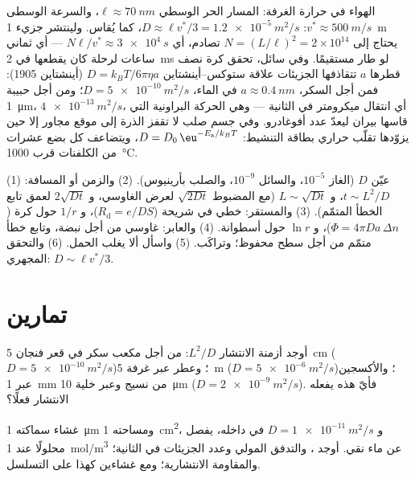 \begin{example}\label{ex:b2:particle-diffusion:kinetic}
الهواء في حرارة الغرفة: المسار الحر الوسطي $\ell \approx \qty{70}{nm}$،
والسرعة الوسطى $v^* \approx \qty{500}{m/s}$: $D \approx \ell v^*/3 =
\qty{1.2e-5}{m^2/s}$، كما يُقاس. ولينتشر جزيء \qty{1}{m}
يحتاج إلى $N = (L/\ell)^2 = 2 \times 10^{14}$ تصادم، أي $N\ell/v^*
\approx \qty{3e4}{s}$ --- أي ثماني ساعات لرحلة كان يقطعها في
\qty{2}{ms} لو طار مستقيمًا. وفي سائل، تحقق كرة نصف قطرها $a$
تتقاذفها الجزيئات علاقة ستوكس--أينشتاين $D =
k_BT/6\pi\eta a$ (أينشتاين 1905): فمن أجل السكر، $a \approx \qty{0.4}{nm}$
في الماء، $D = \qty{5e-10}{m^2/s}$؛ ومن أجل حبيبة \qty{1}{\micro m}،
$\qty{4e-13}{m^2/s}$، أي انتقال ميكرومتر في الثانية ---
وهي الحركة البراونية التي قاسها بيران ليعدّ عدد أفوغادرو. وفي
جسم صلب لا تقفز الذرة إلى موقع مجاور إلا حين يزوّدها تقلّب
حراري بطاقة التنشيط: $D = D_0\,\eu^{-E_{\text{a}}/k_BT}$،
ويتضاعف كل بضع عشرات من الكلفنات قرب \qty{1000}{\celsius}.
\end{example}

\begin{method}\label{meth:b2:particle-diffusion:method}
(1) عيّن $D$ (الغاز $10^{-5}$، والسائل $10^{-9}$، والصلب بأرينيوس).
(2) والزمن أو المسافة: $t \sim L^2/D$، و $L \sim \sqrt{Dt}$ (مع المضبوط
$\sqrt{2Dt}$ لعرض الغاوسي، و $2\sqrt{Dt}$ لعمق تابع الخطأ المتمّم).
(3) والمستقر: خطي في شريحة ($R_{\text{d}} = e/DS$)، و $1/r$ حول
كرة ($\Phi = 4\pi D a\,\Delta n$)، و $\ln r$ حول أسطوانة. (4)
والعابر: غاوسي من أجل نبضة، وتابع خطأ متمّم من أجل سطح محفوظ؛ وتراكَب.
(5) واسأل ألا يغلب الحمل. (6) والتحقق المجهري:
$D \sim \ell v^*/3$.
\end{method}

\section{تمارين}

\begin{exercise}[$\star$]\label{exo:b2:particle-diffusion:1}
أوجد أزمنة الانتشار $L^2/D$: من أجل مكعب سكر في قعر فنجان \qty{5}{cm}
($D = \qty{5e-10}{m^2/s}$)؛ وعطر عبر غرفة \qty{5}{m} ($D =
\qty{5e-6}{m^2/s}$)؛ والأكسجين عبر \qty{1}{mm} من نسيج وعبر
خلية \qty{10}{\micro m} ($D = \qty{2e-9}{m^2/s}$). فأيّ هذه
يفعله الانتشار فعلًا؟
\end{exercise}

\begin{exercise}[$\star$]\label{exo:b2:particle-diffusion:2}
غشاء سماكته \qty{1}{\micro m} ومساحته \qty{1}{cm^2}، و $D =
\qty{1e-11}{m^2/s}$ في داخله، يفصل محلولًا عند \qty{1}{mol/m^3}
عن ماء نقي. أوجد ، والتدفق المولي وعدد الجزيئات
في الثانية؛ والمقاومة الانتشارية؛ ومع غشاءين كهذا على التسلسل.
\end{exercise}

